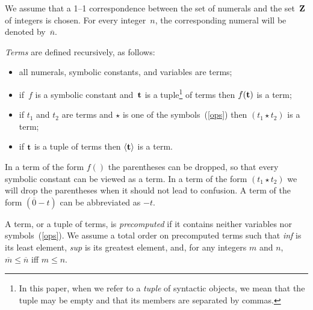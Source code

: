\documentclass{tlp}
\begin{document}
We assume that a 1--1 correspondence between the set of numerals and the
set~${\bf Z}$ of integers is chosen.  For every integer~$n$, the corresponding
numeral will be denoted by~$\overline n$.
 
{\sl Terms} are defined recursively, as follows:
\begin{itemize}
\item all numerals, symbolic constants, and variables are terms; 
\item if~$f$ is a symbolic constant and~${\bf t}$ is a tuple\footnote{
In this paper, when we refer to a {\sl tuple} of syntactic objects, we mean 
that the tuple may be empty and that its members are separated by commas.}  
of terms then $f({\bf t})$ is a term;
\item if $t_1$ and $t_2$ are  terms and $\star$ is one of the 
symbols~(\ref{ops}) then $(t_1\star t_2)$ is a  term;
\item if ${\bf t}$ is a tuple of terms then 
$\langle{\bf t}\rangle$ is a term.
\end{itemize}

In a term of the form $f()$ the parentheses can be dropped, so that every
symbolic constant can be viewed as a term.  In a term of the form
$(t_1\star t_2)$ we will drop the parentheses when it should not lead to 
confusion. A term of the form $(\overline 0 - t)$ can be abbreviated as $-t$. 

A term, or a tuple of terms, is {\sl precomputed} if it contains neither 
variables nor symbols~(\ref{ops}). 
We assume a total order on precomputed terms such that {\it inf} is its least
element, {\it sup} is its greatest element, and,
for any integers $m$ and $n$, $\overline m \leq \overline n$ iff $m \leq n$.  
\end{document}
